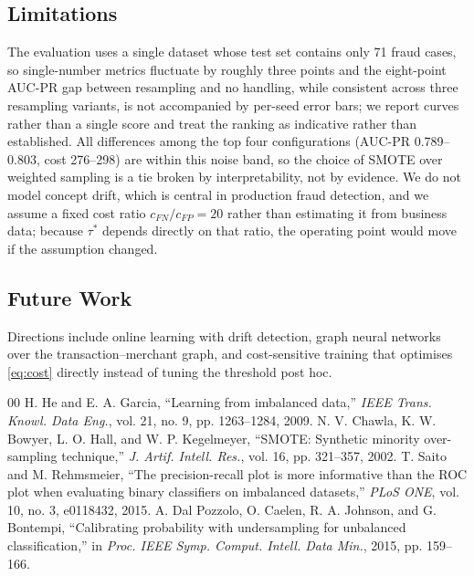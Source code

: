 \documentclass[conference]{IEEEtran}
\begin{document}
\subsection{Limitations}
The evaluation uses a single dataset whose test set contains only 71 fraud
cases, so single-number metrics fluctuate by roughly three points and the
eight-point AUC-PR gap between resampling and no handling, while consistent
across three resampling variants, is not accompanied by per-seed error bars;
we report curves rather than a single score and treat the ranking as
indicative rather than established. All differences among the top four
configurations (AUC-PR 0.789--0.803, cost 276--298) are within this noise
band, so the choice of SMOTE over weighted sampling is a tie broken by
interpretability, not by evidence. We do not model concept drift, which is
central in production fraud detection, and we assume a fixed cost ratio
$c_{FN}/c_{FP}=20$ rather than estimating it from business data; because
$\tau^{*}$ depends directly on that ratio, the operating point would move if
the assumption changed.

\subsection{Future Work}
Directions include online learning with drift detection, graph neural networks
over the transaction--merchant graph, and cost-sensitive training that optimises
\eqref{eq:cost} directly instead of tuning the threshold post hoc.

\begin{thebibliography}{00}
 H. He and E. A. Garcia, ``Learning from imbalanced data,'' \textit{IEEE Trans. Knowl. Data Eng.}, vol. 21, no. 9, pp. 1263--1284, 2009.
 N. V. Chawla, K. W. Bowyer, L. O. Hall, and W. P. Kegelmeyer, ``SMOTE: Synthetic minority over-sampling technique,'' \textit{J. Artif. Intell. Res.}, vol. 16, pp. 321--357, 2002.
 T. Saito and M. Rehmsmeier, ``The precision-recall plot is more informative than the ROC plot when evaluating binary classifiers on imbalanced datasets,'' \textit{PLoS ONE}, vol. 10, no. 3, e0118432, 2015.
 A. Dal Pozzolo, O. Caelen, R. A. Johnson, and G. Bontempi, ``Calibrating probability with undersampling for unbalanced classification,'' in \textit{Proc. IEEE Symp. Comput. Intell. Data Min.}, 2015, pp. 159--166.
\end{thebibliography}
\end{document}
